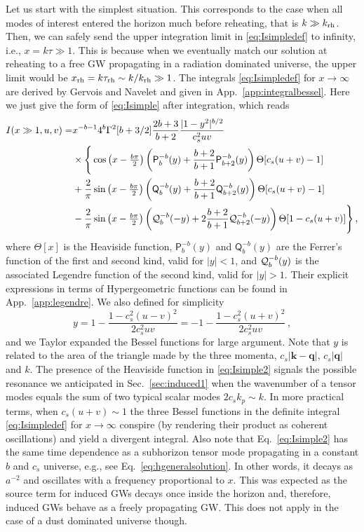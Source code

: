 \documentclass[a4paper,11pt]{article}
\numberwithin{equation}{section}
\begin{document}
Let us start with the simplest situation. This corresponds to the case when all modes of interest entered the horizon much before reheating, that is $k\gg k_{\rm rh}$. Then, we can safely send the upper integration limit in \eqref{eq:Isimpledef} to infinity, i.e., $x=k\tau\gg1$. This is because when we eventually match our solution at reheating to a free GW propagating in a radiation dominated universe, the upper limit would be $x_{\rm rh}=k\tau_{\rm rh}\sim k/k_{\rm rh}\gg 1$. The integrals \eqref{eq:Isimpledef} for $x\to \infty$ are derived by Gervois and Navelet \cite{threebesselI} and given in App.~\ref{app:integralbessel}. Here we just give the form of \eqref{eq:Isimple} after integration, which reads
\begin{align}\label{eq:Isimple2}
I(x\gg1,u,v)=&x^{-b-1} 4^{b}\Gamma^2[b+3/2]\frac{2b+3}{b+2}\frac{|1-y^2|^{b/2}}{c_s^2 uv}\nonumber\\&
\times\Bigg\{\cos\left(x-\tfrac{b\pi}{2}\right)\left(\mathsf{P}^{-b}_{b}(y)+\frac{b+2}{b+1}\mathsf{P}^{-b}_{b+2}(y)\right)\Theta[c_s(u+v)-1]\nonumber\\&
+\frac{2}{\pi}\sin\left(x-\tfrac{b\pi}{2}\right)\left(\mathsf{Q}^{-b}_{b}(y)+\frac{b+2}{b+1}\mathsf{Q}^{-b}_{b+2}(y)\right)\Theta[c_s(u+v)-1]\nonumber\\&
-\frac{2}{\pi}\sin\left(x-\tfrac{b\pi}{2}\right)\left({\cal Q}^{-b}_{b}(-y)+2\frac{b+2}{b+1}\mathsf{\cal Q}^{-b}_{b+2}(-y)\right)\Theta[1-c_s(u+v)]\Bigg\}\,,
\end{align}
where $\Theta[x]$ is the Heaviside function, $\mathsf{P}^{-b}_{b}(y)$ and $\mathsf{Q}^{-b}_{b}(y)$ are the Ferrer's function of the first and second kind, valid for $|y|<1$, and ${\cal Q}^{-b}_{b}(y)$ is the associated Legendre function of the second kind, valid for $|y|>1$. Their explicit expressions in terms of Hypergeometric functions can be found in App.~\ref{app:legendre}. We also defined for simplicity
\begin{equation}\label{eq:y}
y=1-\frac{1-c_s^2(u-v)^2}{2c_s^2 uv}=-1-\frac{1-c_s^2(u+v)^2}{2c_s^2 uv}\,,
\end{equation}
and we Taylor expanded the Bessel functions for large argument. Note that $y$ is related to the area of the triangle made by the three momenta, $c_s|\mathbf{k}-\mathbf{q}|$, $c_s|\mathbf{q}|$ and $k$.
The presence of the Heaviside function in \eqref{eq:Isimple2} signals the possible resonance we anticipated in Sec.~\ref{sec:induced1} when the wavenumber of a tensor modes equals the sum of two typical scalar modes $2c_sk_p\sim k$. In more practical terms, when $c_s(u+v)\sim 1$ the three Bessel functions in the definite integral \eqref{eq:Isimpledef} for $x\to\infty$ conspire (by rendering their product as coherent oscillations) and yield a divergent integral. Also note that Eq.~\eqref{eq:Isimple2} has the same time dependence as a subhorizon tensor mode propagating in a constant $b$ and $c_s$ universe, e.g., see Eq.~\eqref{eq:hgeneralsolution}. In other words, it decays as $a^{-2}$ and oscillates with a frequency proportional to $x$. This was expected as the source term for induced GWs decays once inside the horizon and, therefore, induced GWs behave as a freely propagating GW. This does not apply in the case of a dust dominated universe though. 
\end{document}
